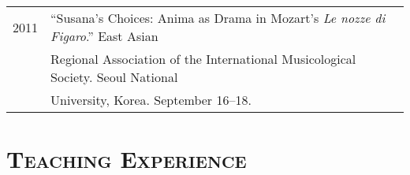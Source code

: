 \documentclass[a4paper,11pt,draft]{article}
\begin{document}
\begin{tabular}{p{2.5cm} p{12.5cm}}
    2011 & “Susana’s Choices: Anima as Drama in Mozart’s \textit{Le nozze di
    Figaro}.” East Asian\\
    & Regional Association of the International Musicological Society. Seoul
    National\\
    & University, Korea. September 16–18.
    
  \end{tabular}
  
  \vspace{5.0mm}
  
  \section*{\textsc{Teaching Experience}}
  
\end{document}
